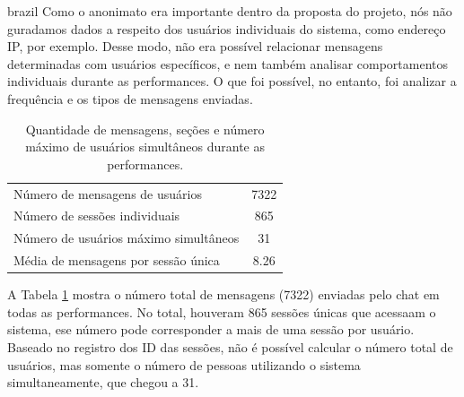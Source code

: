 \begin{otherlanguage*}{brazil}
Como o anonimato era importante dentro da proposta do projeto, nós não guradamos dados a respeito dos usuários individuais do sistema, como endereço IP, por exemplo. Desse modo, não era possível relacionar mensagens determinadas com usuários específicos, e nem também analisar comportamentos individuais durante as performances. O que foi possível, no entanto, foi analizar a frequência e os tipos de mensagens enviadas.


\begin{table}[ht!]
\caption{Quantidade de mensagens, seções e número máximo de usuários simultâneos durante as performances.}{%
\begin{tabular}{@{}lc@{}}\hline
 Número de mensagens de usuários & 7322\\
 Número de sessões individuais & 865\\
 Número de usuários máximo simultâneos & 31\\
 Média de mensagens por sessão única & 8.26\\
\end{tabular}}
\label{tab:overallmsg}
\end{table}

A Tabela \ref{tab:overallmsg} mostra o número total de mensagens (7322) enviadas pelo chat em todas as performances. No total, houveram 865 sessões únicas que acessaam o sistema, ese número pode corresponder a mais de uma sessão por usuário. Baseado no registro dos ID das sessões, não é possível calcular o número total de usuários, mas somente o número de pessoas utilizando o sistema simultaneamente, que chegou a 31.



\end{otherlanguage*}

